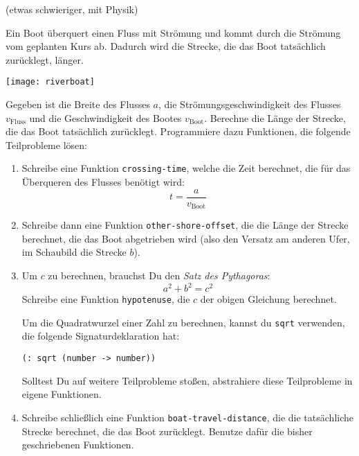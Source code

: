 \begin{aufgabe}  (etwas schwieriger, mit Physik)

  Ein Boot überquert einen Fluss mit Strömung und
  kommt durch die Strömung vom geplanten Kurs ab.  Dadurch wird die
  Strecke, die das Boot tatsächlich zurücklegt, länger.

  \begin{center}
    \texttt{[image: riverboat]}
  \end{center}

  Gegeben ist die Breite des Flusses $a$, die Strömungsgeschwindigkeit
  des Flusses $v_{\text{Fluss}}$ und die Geschwindigkeit des Bootes
  $v_{\text{Boot}}$.  Berechne die Länge der Strecke, die das
  Boot tatsächlich zurücklegt.  Programmiere dazu Funktionen, die
  folgende Teilprobleme lösen:

  \begin{enumerate}
  \item Schreibe eine Funktion \lstinline{crossing-time}, welche die
    Zeit berechnet, die für das Überqueren des Flusses benötigt wird:
    \[t = \frac{a}{v_{\text{Boot}}}\]
  \item Schreibe dann eine Funktion \lstinline{other-shore-offset},
    die die Länge der Strecke berechnet, die das Boot abgetrieben wird
    (also den Versatz am anderen Ufer, im Schaubild die Strecke $b$).

  \item Um $c$ zu berechnen, brauchst Du den \textit{Satz des
      Pythagoras}:
    \begin{displaymath}
      a^2 + b^2 = c^2
    \end{displaymath}
    Schreibe eine Funktion \lstinline{hypotenuse},
    die $c$ der obigen Gleichung berechnet.

    Um die Quadratwurzel einer Zahl zu berechnen,
    kannst du \lstinline{sqrt} verwenden, die folgende
    Signaturdeklaration hat:
\begin{lstlisting}
(: sqrt (number -> number))
\end{lstlisting}
    Solltest Du auf weitere Teilprobleme stoßen, abstrahiere diese
    Teilprobleme in eigene Funktionen.

  \item Schreibe schließlich eine Funktion
    \lstinline{boat-travel-distance}, die die tatsächliche Strecke
    berechnet, die das Boot zurücklegt.  Benutze dafür die bisher
    geschriebenen Funktionen.
  \end{enumerate}
\end{aufgabe}



